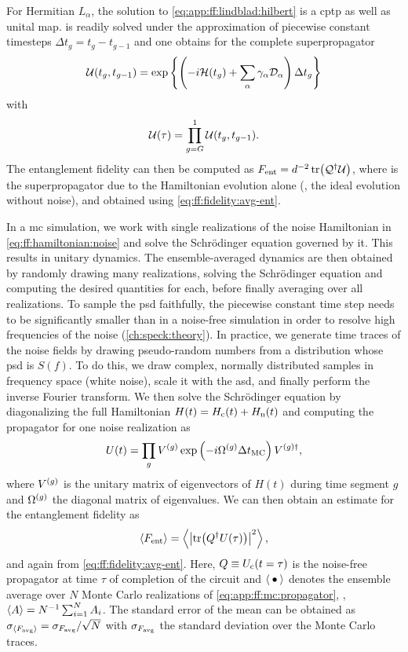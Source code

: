 For Hermitian $L_\alpha$, the solution to \cref{eq:app:ff:lindblad:hilbert} is a \gls{cptp} as well as unital map.
 is readily solved under the approximation of piecewise constant timesteps $\Delta t_g = t_{g} - t_{g-1}$ and one obtains for the complete superpropagator
\begin{equation}\label{eq:app:ff:lindblad:propagator}
    \mathcal{U}(t_{g}, t_{g-1}) = \exp\left\{ \left(-i\mathcal{H}(t_g) + \sum_\alpha\gamma_\alpha\mathcal{D}_\alpha\right) \Delta t_g \right\}
\end{equation}
with
\begin{equation}
    \mathcal{U}(\tau) = \prod_{g=G}^1\mathcal{U}(t_{g}, t_{g-1}).
\end{equation}
The entanglement fidelity can then be computed as $F_{\mathrm{ent}} = d^{-2}\tr(\mathcal{Q}^\dagger\mathcal{U})$, where \liouvQ is the superpropagator due to the Hamiltonian evolution alone (\ie, the ideal evolution without noise), and \avgfid obtained using \cref{eq:ff:fidelity:avg-ent}.

In a \gls{mc} simulation, we work with single realizations of the noise Hamiltonian in \cref{eq:ff:hamiltonian:noise} and solve the Schrödinger equation governed by it.
This results in unitary dynamics.
The ensemble-averaged dynamics are then obtained by randomly drawing many realizations, solving the Schrödinger equation and computing the desired quantities for each, before finally averaging over all realizations.
To sample the \gls{psd} faithfully, the piecewise constant time step needs to be significantly smaller than in a noise-free simulation in order to resolve high frequencies of the noise (\cf \cref{ch:speck:theory}).
In practice, we generate time traces of the noise fields by drawing pseudo-random numbers from a distribution whose \gls{psd} is $S(f)$.
To do this, we draw complex, normally distributed samples in frequency space (\ie white noise), scale it with the \gls{asd}, and finally perform the inverse Fourier transform.
We then solve the Schrödinger equation by diagonalizing the full Hamiltonian $H(t) = H_{\mathrm{c}}(t) + H_{\mathrm{n}}(t)$ and computing the propagator for one noise realization as
\begin{equation}\label{eq:app:ff:mc:propagator}
    U(t) = \prod_g V^{(g)}\exp\left(-i\Omega^{(g)}\Delta t_{\mathrm{MC}}\right) V^{(g)\dagger},
\end{equation}
where $V^{(g)}$ is the unitary matrix of eigenvectors of $H(t)$ during time segment $g$ and $\Omega^{(g)}$ the diagonal matrix of eigenvalues.
We can then obtain an estimate for the entanglement fidelity \entfid as
\begin{equation}
    \ev{\entfid} = \ev{\abs{\tr(Q\adjoint U(\tau))}^2},
\end{equation}
and \avgfid again from \cref{eq:ff:fidelity:avg-ent}.
Here, $Q\equiv U_{\mathrm{c}}(t=\tau)$ is the noise-free propagator at time $\tau$ of completion of the circuit and $\ev{\placeholder}$ denotes the ensemble average over $N$ Monte Carlo realizations of \cref{eq:app:ff:mc:propagator}, \ie, $\ev{A}=N\inverse\sum_{i=1}^N A_i$.
The standard error of the mean can be obtained as $\sigma_{\ev{\avgfid}} = \sigma_{\avgfid} / \sqrt{N}$ with $\sigma_{F_{\mathrm{avg}}}$ the standard deviation over the Monte Carlo traces.


